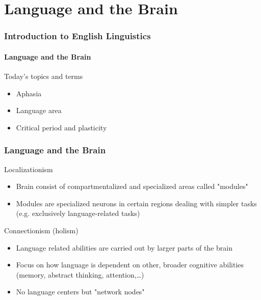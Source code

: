\documentclass[12pt, table]{beamer}
\begin{document}


\section{Language and the Brain}
\begin{frame}
\frametitle{Introduction to English Linguistics}
\framesubtitle{Language and the Brain}
Today's topics and terms\\[.5cm]
\begin{itemize}
\item Aphasia
\item Language area
\item Critical period and plasticity 
\end{itemize}
\end{frame}

\begin{frame}
\frametitle{Language and the Brain}
Localizationism\\
\begin{itemize}
\item Brain consist of compartmentalized and specialized areas called  "modules"
\item Modules are specialized neurons in certain regions dealing with simpler tasks (e.g. exclusively language-related tasks)
\end{itemize}
Connectionism (holism)
\begin{itemize}
\item Language related abilities are carried out by larger parts of the brain
\item Focus on how language is dependent on other, broader cognitive abilities (memory, abstract thinking, attention,\dots)
\item No language centers but "network nodes"
\end{itemize}
\end{frame}
\end{document}
